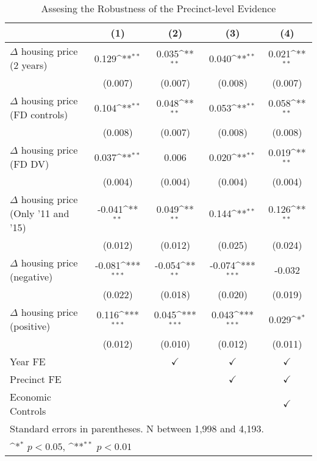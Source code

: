 \begin{table}[htbp]\centering
	\def\sym#1{\ifmmode^{#1}\else\(^{#1}\)\fi}
	\caption{Assesing the Robustness of the Precinct-level Evidence} \label{robustness}
	\begin{tabular}{l*{4}{c}}
		\hline\hline
		&\multicolumn{1}{c}{(1)}        &\multicolumn{1}{c}{(2)}        &\multicolumn{1}{c}{(3)}        &\multicolumn{1}{c}{(4)}        \\
\hline
$\Delta$ housing price (2 years)&       0.129\sym{**}&       0.035\sym{**}&       0.040\sym{**}&       0.021\sym{**}\\
&     (0.007)        &     (0.007)        &     (0.008)        &     (0.007)        \\
[1em]
$\Delta$ housing price (FD controls)&       0.104\sym{**}&       0.048\sym{**}&       0.053\sym{**}&       0.058\sym{**}\\
&     (0.008)        &     (0.007)        &     (0.008)        &     (0.008)        \\
[1em]
$\Delta$ housing price (FD DV)&       0.037\sym{**}&       0.006        &       0.020\sym{**}&       0.019\sym{**}\\
&     (0.004)        &     (0.004)        &     (0.004)        &     (0.004)        \\
[1em]
$\Delta$ housing price (Only '11 and '15)&      -0.041\sym{**}&       0.049\sym{**}&       0.144\sym{**}&       0.126\sym{**}\\
&     (0.012)        &     (0.012)        &     (0.025)        &     (0.024)        \\
[1em]
$\Delta$ housing price (negative)&      -0.081\sym{***}&      -0.054\sym{**} &      -0.074\sym{***}&      -0.032         \\
&     (0.022)         &     (0.018)         &     (0.020)         &     (0.019)         \\
[1em]
$\Delta$ housing price (positive)&       0.116\sym{***}&       0.045\sym{***}&       0.043\sym{***}&       0.029\sym{*}  \\
&     (0.012)         &     (0.010)         &     (0.012)         &     (0.011)         \\
[1em]
\hline Year FE  &                    & $\checkmark$                    &$\checkmark$        &$\checkmark$        \\
[1em]
Precinct FE  &                    &                    &$\checkmark$        &$\checkmark$        \\
[1em]
Economic Controls             &                    &                    &                    &$\checkmark$        \\
\hline\hline
\multicolumn{5}{l}{\footnotesize Standard errors in parentheses. N between 1,998 and 4,193.}\\
\multicolumn{5}{l}{\footnotesize \sym{*} \(p<0.05\), \sym{**} \(p<0.01\)}\\
\end{tabular}
\end{table}